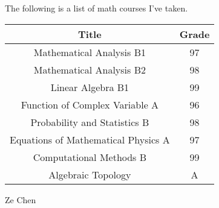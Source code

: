\documentclass{article}
\title{}
\author{}
\date{}
\begin{document}
The following is a list of math courses I've taken.

\begin{longtable}{cc}
\toprule
Title & Grade \\
\midrule
Mathematical Analysis B1 & 97 \\
Mathematical Analysis B2 & 98 \\
Linear Algebra B1 & 99 \\
Function of Complex Variable A & 96 \\
Probability and Statistics B & 98 \\
Equations of Mathematical Physics A & 97 \\
Computational Methods B & 99 \\
Algebraic Topology & A \\
\bottomrule
\end{longtable}
\vspace{2em}
Ze Chen

% 
% 
\end{document}
